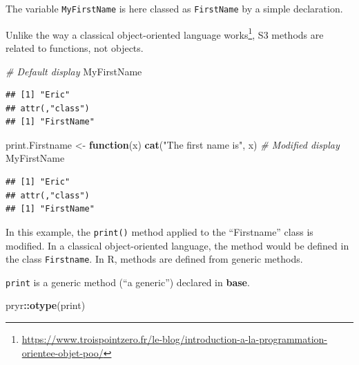 \documentclass[
  12pt,
  american,
  a4paper,
  extrafontsizes,onecolumn,openright
  ]{memoir}
\newenvironment{Shaded}{\begin{snugshade}}{\end{snugshade}}
\newcommand{\CommentTok}[1]{\textcolor[rgb]{0.56,0.35,0.01}{\textit{#1}}}
\newcommand{\ControlFlowTok}[1]{\textcolor[rgb]{0.13,0.29,0.53}{\textbf{#1}}}
\newcommand{\FunctionTok}[1]{\textcolor[rgb]{0.13,0.29,0.53}{\textbf{#1}}}
\newcommand{\NormalTok}[1]{#1}
\newcommand{\OtherTok}[1]{\textcolor[rgb]{0.56,0.35,0.01}{#1}}
\newcommand{\SpecialCharTok}[1]{\textcolor[rgb]{0.81,0.36,0.00}{\textbf{#1}}}
\newcommand{\StringTok}[1]{\textcolor[rgb]{0.31,0.60,0.02}{#1}}
\begin{document}
\normalsize

The variable \texttt{MyFirstName} is here classed as \texttt{FirstName} by a simple declaration.

Unlike the way a classical object-oriented language works\footnote{\url{https://www.troispointzero.fr/le-blog/introduction-a-la-programmation-orientee-objet-poo/}}, S3 methods are related to functions, not objects.

\scriptsize

\begin{Shaded}
\begin{Highlighting}[]
\CommentTok{\# Default display}
\NormalTok{MyFirstName}
\end{Highlighting}
\end{Shaded}

\begin{verbatim}
## [1] "Eric"
## attr(,"class")
## [1] "FirstName"
\end{verbatim}

\begin{Shaded}
\begin{Highlighting}[]
\NormalTok{print.Firstname }\OtherTok{\textless{}{-}} \ControlFlowTok{function}\NormalTok{(x) }\FunctionTok{cat}\NormalTok{(}\StringTok{"The first name is"}\NormalTok{, x)}
\CommentTok{\# Modified display}
\NormalTok{MyFirstName}
\end{Highlighting}
\end{Shaded}

\begin{verbatim}
## [1] "Eric"
## attr(,"class")
## [1] "FirstName"
\end{verbatim}

\normalsize

In this example, the \texttt{print()} method applied to the \enquote{Firstname} class is modified.
In a classical object-oriented language, the method would be defined in the class \texttt{Firstname}.
In R, methods are defined from generic methods.

\texttt{print} is a generic method (\enquote{a generic}) declared in \textbf{base}.

\scriptsize

\begin{Shaded}
\begin{Highlighting}[]
\NormalTok{pryr}\SpecialCharTok{::}\FunctionTok{otype}\NormalTok{(print)}
\end{Highlighting}
\end{Shaded}
\end{document}
